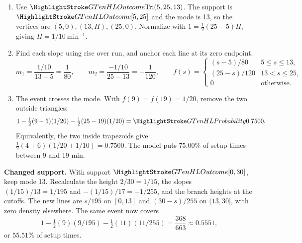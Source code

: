 \begin{enumerate}
  \item Use \(\OutlineModel{\Tri(5,25,13)}\). The support is \(\OutlineModel{[5,25]}\) and the mode is 13, so the vertices are \((5,0),(13,H),(25,0)\). Normalize with \(1=\tfrac12(25-5)H\), giving \(H=1/10\ \mathrm{min}^{-1}\).
  \item Find each slope using rise over run, and anchor each line at its zero endpoint.
  \[
    m_1=\frac{1/10}{13-5}=\frac{1}{80},\qquad
    m_2=\frac{-1/10}{25-13}=-\frac{1}{120},\qquad
    f(s)=\begin{cases}
      (s-5)/80 & 5\le s\le13,\\
      (25-s)/120 & 13<s\le25,\\
      0 & \text{otherwise}.
    \end{cases}
  \]
  \item The event crosses the mode. With \(f(9)=f(19)=1/20\), remove the two outside triangles:
  \[
    1-\tfrac12(9-5)(1/20)-\tfrac12(25-19)(1/20)=\OutlineEvent{0.7500}.
  \]
  Equivalently, the two inside trapezoids give \(\tfrac12(4+6)(1/20+1/10)=0.7500\).
  The model puts \(75.00\%\) of setup times between 9 and 19 min.
\end{enumerate}

\textbf{Changed support.} With support \(\OutlineModel{[0,30]}\), keep mode 13. Recalculate the height \(2/30=1/15\), the slopes \((1/15)/13=1/195\) and \(-(1/15)/17=-1/255\), and the branch heights at the cutoffs. The new lines are \(s/195\) on \([0,13]\) and \((30-s)/255\) on \((13,30]\), with zero density elsewhere. The same event now covers
\[
  1-\tfrac12(9)(9/195)-\tfrac12(11)(11/255)=\frac{368}{663}\approx0.5551,
\]
or \(55.51\%\) of setup times. 

\noindent
\begin{minipage}[t]{0.49\linewidth}
\end{minipage}\hfill
\begin{minipage}[t]{0.49\linewidth}
\end{minipage}
\par\nobreak\vspace{6pt}

